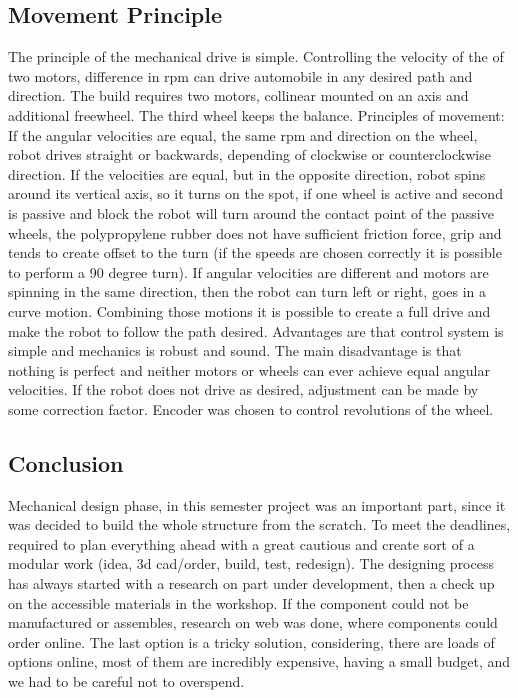 \documentclass[11pt]{article}
\begin{document}
\subsection*{Movement Principle}
The principle of the mechanical drive is simple. Controlling the velocity of the of two motors, difference in rpm can drive automobile in any desired path and direction. The build requires two motors, collinear mounted on an axis and additional freewheel. The third wheel keeps the balance. Principles of movement: If the angular velocities are equal, the same rpm and direction on the wheel, robot drives straight or backwards, depending of clockwise or counterclockwise direction. If the velocities are equal, but in the opposite direction, robot spins around its vertical axis, so it turns on the spot, if one wheel is active and second is passive and block the robot will turn around the contact point of the passive wheels, the polypropylene rubber does not have sufficient friction force, grip and tends to create offset to the turn (if the speeds are chosen correctly it is possible to perform a 90 degree turn). If angular velocities are different and motors are spinning in the same direction, then the robot can turn left or right, goes in a curve motion. Combining those motions it is possible to create a full drive and make the robot to follow the path desired. Advantages are that control system is simple and mechanics is robust and sound. The main disadvantage is that nothing is perfect and neither motors or wheels can ever achieve equal angular velocities. If the robot does not drive as desired, adjustment can be made by some correction factor. Encoder was chosen to control revolutions of the wheel.

\subsection*{Conclusion}
Mechanical design phase, in this semester project was an important part, since it was decided to build the whole structure from the scratch. To meet the deadlines, required to plan everything ahead with a great cautious and create sort of a modular work (idea, 3d cad/order, build, test, redesign). The designing process has always started with a research on part under development, then a check up on the accessible materials in the workshop. If the component could not be manufactured or assembles, research on web was done, where components could order online. The last option is a tricky solution, considering, there are loads of options online, most of them are incredibly expensive, having a small budget, and we had to be careful not to overspend.
\end{document}
